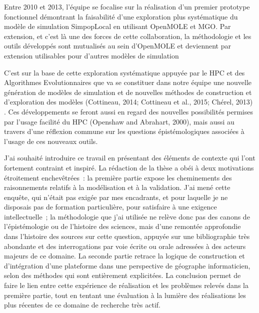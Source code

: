 Entre 2010 et 2013, l'équipe se focalise sur la réalisation d'un premier prototype fonctionnel démontrant la faisabilité d'une exploration plus systématique du modèle de simulation SimpopLocal en utilisant OpenMOLE et MGO. Par extension, et c'est là une des forces de cette collaboration, la méthodologie et les outils développés sont mutualisés au sein d'OpenMOLE et deviennent par extension utilisables pour d'autres modèles de simulation \autocites{Schmitt2014, Reuillon2015} 
 
C'est sur la base de cette exploration systématique appuyée par le HPC et des Algorithmes Evolutionnaires que va se constituer dans notre équipe une nouvelle génération de modèles de simulation et de nouvelles méthodes de construction et d'exploration des modèles (Cottineau, 2014; Cottineau et al., 2015; Chérel, 2013)%
⁠. Ces développements se feront aussi en regard des nouvelles possibilités permises par l'usage facilité du HPC (Openshaw and Abrahart, 2000)⁠, mais aussi au travers d'une réflexion commune sur les questions épistémologiques associées à l'usage de ces nouveaux outils. 

J’ai souhaité introduire ce travail en présentant des éléments de contexte qui l’ont fortement contraint et inspiré. La rédaction de la thèse a obéi à deux motivations étroitement enchevêtrées : la première partie expose les cheminements des raisonnements relatifs à la modélisation et à la validation. J’ai mené cette enquête, qui n’était pas exigée par mes encadrants, et pour laquelle je ne disposais pas de formation particulière, pour satisfaire à une exigence intellectuelle ; la méthodologie que j’ai utilisée ne relève donc pas des canons de l’épistémologie ou de l’histoire des sciences, mais d’une remontée approfondie dans l’histoire des sources sur cette question, appuyée sur une bibliographie très abondante et des interrogations par voie écrite ou orale adressées à des acteurs majeurs de ce domaine. La seconde partie retrace la logique de construction et d’intégration d’une plateforme dans une perspective de géographe informaticien, selon des méthodes qui sont entièrement explicitées. La conclusion permet de faire le lien entre cette expérience de réalisation et les problèmes relevés dans la première partie, tout en tentant une évaluation à la lumière des réalisations les plus récentes de ce domaine de recherche très actif. 